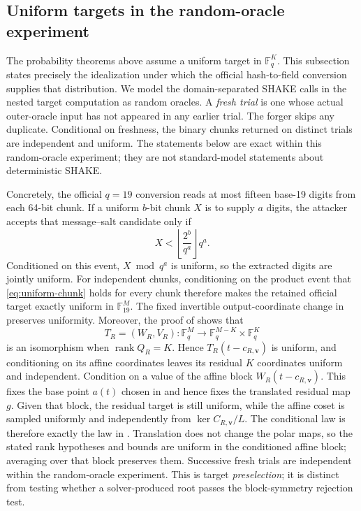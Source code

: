 \documentclass[11pt]{article}
\newcommand{\F}{\mathbb F}
\newcommand{\rank}{\operatorname{rank}}
\begin{document}
\subsection{Uniform targets in the random-oracle experiment}
\label{sec:target-sampling}

The probability theorems above assume a uniform target in $\F_q^K$.
This subsection states precisely the idealization under which the official
hash-to-field conversion supplies that distribution.  We model the
domain-separated SHAKE calls in the nested target computation as random
oracles.  A \emph{fresh trial} is one whose actual outer-oracle input has not
appeared in any earlier trial.  The forger skips any duplicate.  Conditional
on freshness, the binary chunks returned on distinct trials are independent
and uniform.  The statements below are exact within this random-oracle
experiment; they are not standard-model statements about deterministic SHAKE.

Concretely, the official $q=19$ conversion reads at most fifteen base-19 digits
from each 64-bit chunk.  If a uniform $b$-bit chunk $X$ is to supply $a$
digits, the attacker accepts that message--salt candidate only if
\begin{equation}\label{eq:uniform-chunk}
 X<\left\lfloor\frac{2^b}{q^a}\right\rfloor q^a.
\end{equation}
Conditioned on this event, $X\bmod q^a$ is uniform, so the extracted
digits are jointly uniform.  For independent chunks, conditioning on the
product event that \eqref{eq:uniform-chunk} holds for every chunk therefore
makes the retained official target exactly uniform in $\F_{19}^M$.  The fixed
invertible output-coordinate change in  preserves
uniformity.  Moreover, the proof of  shows that
\[
 T_R=(W_R,V_R):\F_q^M\longrightarrow\F_q^{M-K}\times\F_q^K
\]
is an isomorphism when $\rank Q_R=K$.  Hence
$T_R(t-c_{R,\mathbf v})$ is uniform, and conditioning on its affine
coordinates leaves its residual $K$ coordinates uniform and independent.
Condition on a value of the affine block
$W_R(t-c_{R,\mathbf v})$.  This fixes the base point $a(t)$ chosen in
 and hence fixes the translated residual map $g$.  Given that
block, the residual target is still uniform, while the affine coset is sampled
uniformly and independently from $\ker C_{R,\mathbf v}/L$.  The conditional
law is therefore exactly the law in .  Translation
does not change the polar maps, so the stated rank hypotheses and bounds are
uniform in the conditioned affine block; averaging over that block preserves
them.  Successive fresh trials are independent within the random-oracle
experiment.  This is
target \emph{preselection}; it is distinct
from testing whether a solver-produced root passes the block-symmetry
rejection test.
\end{document}
